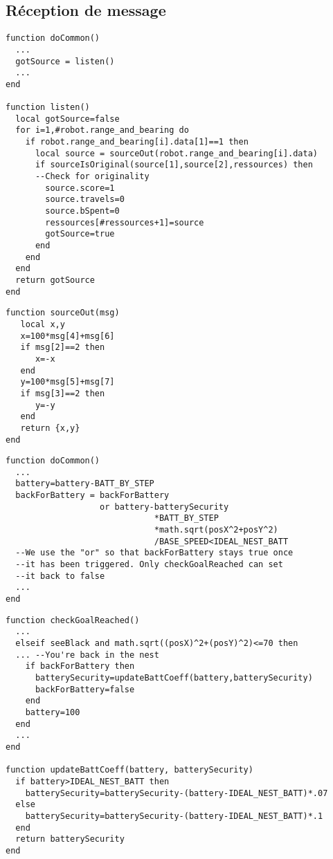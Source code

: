 \begin{subappendices}
\clearpage
\subsection{Réception de message}

\begin{lstlisting}[caption=Ecoute du capteur à chaque pas]
function doCommon()
  ...
  gotSource = listen()
  ...
end

function listen()
  local gotSource=false
  for i=1,#robot.range_and_bearing do
    if robot.range_and_bearing[i].data[1]==1 then
      local source = sourceOut(robot.range_and_bearing[i].data)
      if sourceIsOriginal(source[1],source[2],ressources) then
      --Check for originality
        source.score=1
        source.travels=0
        source.bSpent=0
        ressources[#ressources+1]=source
        gotSource=true
      end
    end
  end
  return gotSource
end
\end{lstlisting}

\begin{lstlisting}[caption=Décodage du message]
function sourceOut(msg)
   local x,y
   x=100*msg[4]+msg[6]
   if msg[2]==2 then
      x=-x
   end
   y=100*msg[5]+msg[7]
   if msg[3]==2 then
      y=-y
   end
   return {x,y}
end
\end{lstlisting}

\end{subappendices}

\begin{lstlisting}[caption=appel par doCommon]
function doCommon()
  ...
  battery=battery-BATT_BY_STEP
  backForBattery = backForBattery
                   or battery-batterySecurity
                              *BATT_BY_STEP
                              *math.sqrt(posX^2+posY^2)
                              /BASE_SPEED<IDEAL_NEST_BATT
  --We use the "or" so that backForBattery stays true once
  --it has been triggered. Only checkGoalReached can set
  --it back to false
  ...
end
\end{lstlisting}

\begin{lstlisting}[caption=Réévaluation de batterySecurity]
function checkGoalReached()
  ...
  elseif seeBlack and math.sqrt((posX)^2+(posY)^2)<=70 then
  ... --You're back in the nest
    if backForBattery then
      batterySecurity=updateBattCoeff(battery,batterySecurity)
      backForBattery=false
    end
    battery=100
  end
  ...
end

function updateBattCoeff(battery, batterySecurity)
  if battery>IDEAL_NEST_BATT then
    batterySecurity=batterySecurity-(battery-IDEAL_NEST_BATT)*.07
  else
    batterySecurity=batterySecurity-(battery-IDEAL_NEST_BATT)*.1
  end
  return batterySecurity
end
\end{lstlisting}
